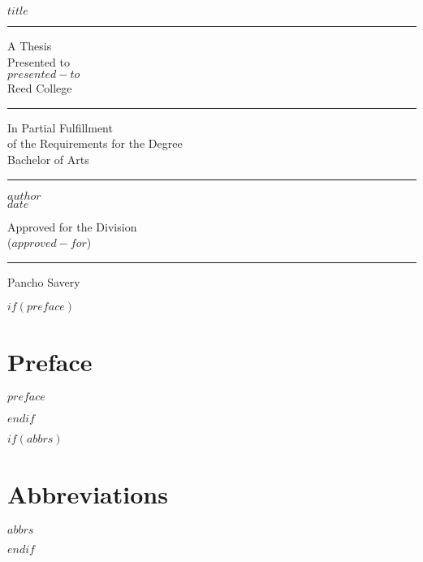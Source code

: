 %
%
%
%
%
%
%


\frontmatter
{}  %
\begin{center}
    $title$
    \vfil
    \hrule
    \vfil
    A Thesis \\
    Presented to \\
    $presented-to$ \\
    Reed College
    \vfil
    \hrule
    \vfil
    In Partial Fulfillment \\
    of the Requirements for the Degree \\
    Bachelor of Arts
    \vfil
    \hrule
    \vfil
    $author$ \\
    $date$
    
    \cleardoublepage
    \vspace*{\fill}
    \par\vskip 6cm
    Approved for the Division \\
    ($approved-for$)
    \par\vskip 2cm
    \hrule  %
    \par\vskip 3cm
    Pancho Savery  %
    \vspace*{\fill}
\end{center}

$if(preface)$
\cleardoublepage

\chapter*{Preface}\label{preface}


$preface$

$endif$

$if(abbrs)$
\cleardoublepage

\chapter*{Abbreviations}\label{abbreviations}


$abbrs$

$endif$
